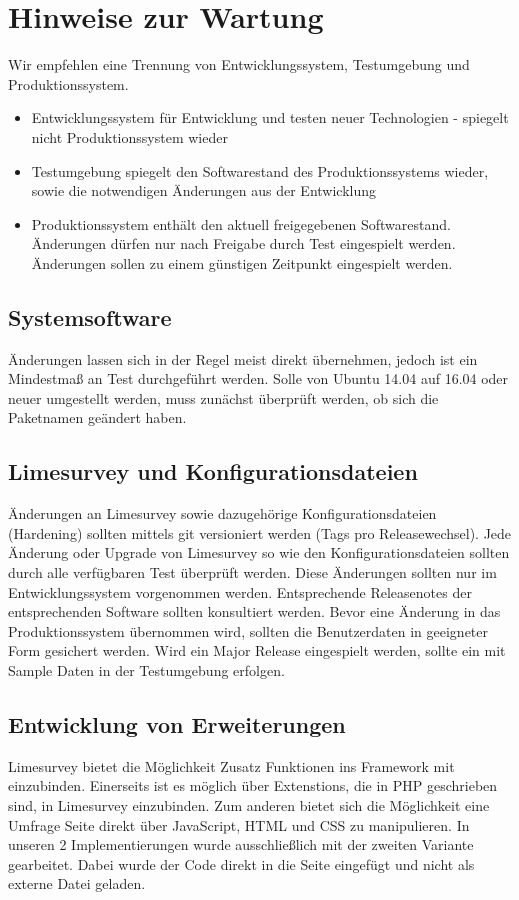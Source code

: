 \section{Hinweise zur Wartung}
Wir empfehlen eine Trennung von Entwicklungssystem, Testumgebung und Produktionssystem.
\begin{itemize}
  \item Entwicklungssystem für Entwicklung und testen neuer Technologien - spiegelt nicht Produktionssystem wieder
  \item Testumgebung spiegelt den Softwarestand des Produktionssystems wieder, sowie die notwendigen Änderungen aus der Entwicklung
  \item Produktionssystem enthält den aktuell freigegebenen Softwarestand. Änderungen dürfen nur nach Freigabe durch Test eingespielt werden. Änderungen sollen zu einem günstigen Zeitpunkt eingespielt werden.
\end{itemize}
\newpage
\subsection{Systemsoftware}
Änderungen lassen sich in der Regel meist direkt übernehmen, jedoch ist ein Mindestmaß an Test durchgeführt werden.
Solle von Ubuntu 14.04 auf 16.04 oder neuer umgestellt werden, muss zunächst überprüft werden, ob sich die Paketnamen geändert haben.
\subsection{Limesurvey und Konfigurationsdateien}
Änderungen an Limesurvey sowie dazugehörige Konfigurationsdateien (Hardening) sollten mittels git versioniert werden (Tags pro Releasewechsel).
Jede Änderung oder Upgrade von Limesurvey so wie den Konfigurationsdateien sollten durch alle verfügbaren Test überprüft werden. Diese Änderungen sollten nur im Entwicklungssystem vorgenommen werden. Entsprechende Releasenotes der entsprechenden Software sollten konsultiert werden. Bevor eine Änderung in das Produktionssystem übernommen wird, sollten die Benutzerdaten in geeigneter Form gesichert werden. Wird ein Major Release eingespielt werden, sollte ein mit Sample Daten in der Testumgebung erfolgen.
\subsection{Entwicklung von Erweiterungen}
Limesurvey bietet die Möglichkeit Zusatz Funktionen ins Framework mit einzubinden.
Einerseits ist es möglich über Extenstions, die in PHP geschrieben sind, in Limesurvey einzubinden. Zum anderen bietet sich die Möglichkeit eine Umfrage Seite direkt über JavaScript, HTML und CSS zu manipulieren.
In unseren 2 Implementierungen wurde ausschließlich mit der zweiten Variante gearbeitet. Dabei wurde der Code direkt in die Seite eingefügt und nicht als externe Datei geladen.
